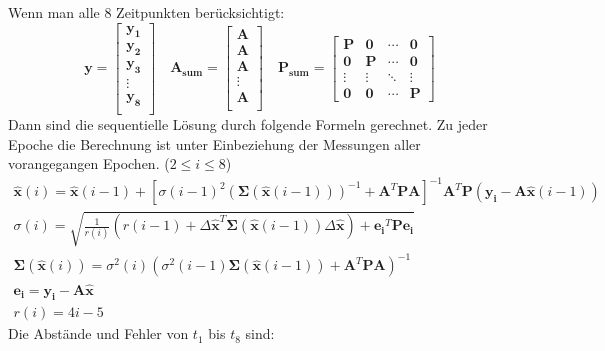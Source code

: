 Wenn man alle 8 Zeitpunkten berücksichtigt:
\begin{equation}
	\bm{y} = \begin{bmatrix}
	\bm{y_1} \\
	\bm{y_2} \\
	\bm{y_3} \\
	\vdots \\
	\bm{y_8} \\
	\end{bmatrix} \quad \bm{A_{sum}} = \begin{bmatrix}
	\bm{A} \\
	\bm{A} \\
	\bm{A} \\
	\vdots \\
	\bm{A} \\
	\end{bmatrix} \quad \bm{P_{sum}} = \begin{bmatrix}
	\bm{P} & \bm{0} & \cdots & \bm{0} \\
	\bm{0} & \bm{P} & \cdots & \bm{0} \\
	\vdots & \vdots & \ddots & \vdots \\
	\bm{0} & \bm{0} & \cdots & \bm{P}
	\end{bmatrix}
\end{equation}
Dann sind die sequentielle Lösung durch folgende Formeln gerechnet. Zu jeder Epoche die Berechnung ist unter Einbeziehung der Messungen aller vorangegangen Epochen. ($2 \leq i \leq 8$)
\begin{gather}
	\bm{\hat{x}}(i) = \bm{\hat{x}}(i-1) + \left[\sigma(i-1)^2 (\bm{\Sigma}(\bm{\hat{x}}(i-1)))^{-1} + \bm{A}^T \bm{P} \bm{A}\right]^{-1} \bm{A}^T \bm{P} (\bm{y_i} - \bm{A} \bm{\hat{x}}(i-1)) \\
	\sigma(i) = \sqrt{\frac{1}{r(i)} (r(i-1) + \Delta\bm{\hat{x}}^T \bm{\Sigma}(\bm{\hat{x}}(i-1)) \Delta \bm{\hat{x}}) + \bm{e_i}^T \bm{P} \bm{e_i}} \\
	\bm{\Sigma}(\bm{\hat{x}}(i)) = \sigma^2(i) (\sigma^2(i-1) \bm{\Sigma}(\bm{\hat{x}}(i-1)) + \bm{A}^T \bm{P} \bm{A})^{-1} \\
	\bm{e_i} = \bm{y_i} - \bm{A}\bm{\hat{x}} \\
	r(i) = 4i-5
\end{gather}
Die Abstände und Fehler von $t_1$ bis $t_8$ sind: 
